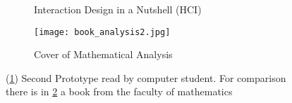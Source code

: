 \begin{figure}[h]
  \centering
  \begin{subfigure}{0.48\textwidth}
    \centering
    \todo
    \caption{Interaction Design in a Nutshell (HCI)}
    \label{fig:meta_prototype2_hci}
  \end{subfigure}
  \hspace{0.1em}
  \begin{subfigure}{0.48\textwidth}
    \centering
    \texttt{[image: book\_analysis2.jpg]}
    \caption{Cover of Mathematical Analysis}
    \label{fig:meta_prototype2_math}
  \end{subfigure}
  \caption[]{(\ref{fig:meta_prototype2_hci}) Second Prototype read by computer student. For comparison there is in \ref{fig:meta_prototype2_math} a book from the faculty of mathematics}
  \label{fig:meta_prototype2}
\end{figure}
